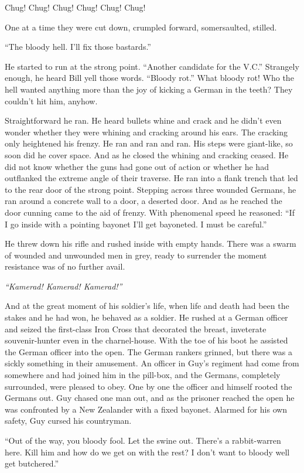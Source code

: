 Chug! Chug! Chug! Chug! Chug! Chug!

One at a time they were cut down, crumpled forward, somersaulted, stilled.

``The bloody hell. I'll fix those bastards.''

He started to run at the strong point. ``Another candidate for the V.C.'' Strangely enough, he heard Bill yell those words. ``Bloody rot.'' What bloody rot! Who the hell wanted anything more than the joy of kicking a German in the teeth? They couldn't hit him, anyhow.

Straightforward he ran. He heard bullets whine and crack and he didn't even wonder whether they were whining and cracking around his ears. The cracking only heightened his frenzy. He ran and ran and ran. His steps were giant-like, so soon did he cover space. And as he closed the whining and cracking ceased. He did not know whether the guns had gone out of action or whether he had outflanked the extreme angle of their traverse. He ran into a flank trench that led to the rear door of the strong point. Stepping across three wounded Germans, he ran around a concrete wall to a door, a deserted door. And as he reached the door cunning came to the aid of frenzy. With phenomenal speed he reasoned: ``If I go inside with a pointing bayonet I'll get bayoneted. I must be careful.''

He threw down his rifle and rushed inside with empty hands. There was a swarm of wounded and unwounded men in grey, ready to surrender the moment resistance was of no further avail.

\emph{``Kamerad! Kamerad! Kamerad!''}

And at the great moment of his soldier's life, when life and death had been the stakes and he had won, he behaved as a soldier. He rushed at a German officer and seized the first-class Iron Cross that decorated the breast, inveterate souvenir-hunter even in the charnel-house. With the toe of his boot he assisted the German officer into the open. The German rankers grinned, but there was a sickly something in their amusement. An officer in Guy's regiment had come from somewhere and had joined him in the pill-box, and the Germans, completely surrounded, were pleased to obey. One by one the officer and himself rooted the Germans out. Guy chased one man out, and as the prisoner reached the open he was confronted by a New Zealander with a fixed bayonet. Alarmed for his own safety, Guy cursed his countryman.

``Out of the way, you bloody fool. Let the swine out. There's a rabbit-warren here. Kill him and how do we get on with the rest? I don't want to bloody well get butchered.''

